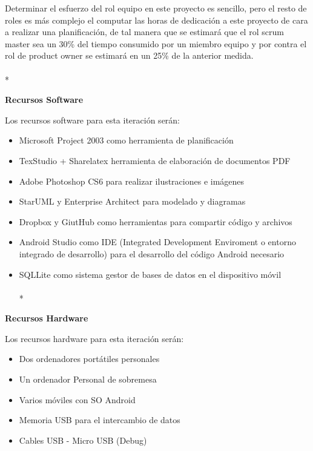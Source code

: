\documentclass[../pfc.tex]{subfiles}
\begin{document}
	Determinar el esfuerzo del rol equipo en este proyecto es sencillo, pero el resto de roles es más complejo el computar las horas de dedicación a este proyecto de cara a realizar una planificación, de tal manera que se estimará que el rol scrum master sea un 30\% del tiempo consumido por un miembro equipo y por contra el rol de product owner se estimará en un 25\% de la anterior medida.\\\\*
	
	\textbf{Recursos Software}
	
	Los recursos software para esta iteración serán:
	\begin{itemize}
		\item Microsoft Project 2003 como herramienta de planificación
		\item TexStudio + Sharelatex herramienta de elaboración de documentos PDF
		\item Adobe Photoshop CS6 para realizar ilustraciones e imágenes
		\item StarUML y Enterprise Architect para modelado y diagramas
		\item Dropbox y GiutHub como herramientas para compartir código y archivos
		\item Android Studio como IDE (Integrated Development Enviroment o entorno integrado de desarrollo) para el desarrollo del código Android necesario
		\item SQLLite como sistema gestor de bases de datos en el dispositivo móvil\\\\*
	\end{itemize}
	
	\textbf{Recursos Hardware}
	
	Los recursos hardware para esta iteración serán:
	
	\begin{itemize}
		\item Dos ordenadores portátiles personales
		\item Un ordenador Personal de sobremesa
		\item Varios móviles con SO Android
		\item Memoria USB para el intercambio de datos
		\item Cables USB - Micro USB (Debug)
	\end{itemize}	
	
\end{document}
